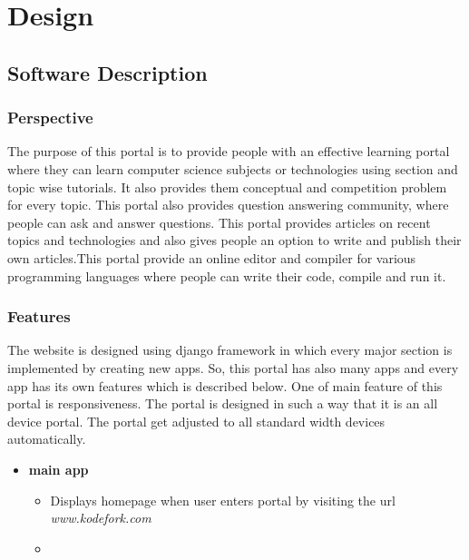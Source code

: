 \chapter{Design}
\section{Software Description}
\subsection{Perspective}
The purpose of this portal is to provide people with an effective learning portal where they can learn computer science subjects or technologies using section and topic wise tutorials. It also provides them conceptual and competition problem for every topic. This portal also provides question answering community, where people can ask and answer questions. This portal provides articles on recent topics and technologies and also gives people an option to write and publish their own articles.This portal provide an online editor and compiler for various programming languages where people can write their code, compile and run it.


\subsection{Features}
The website is designed using django framework in which every major section is implemented by creating new apps. So, this portal has also many apps and every app has its own features which is described below. One of main feature of this portal is responsiveness. The portal is designed in such a way that it is an all device portal. The portal get adjusted to all standard width devices automatically.

\begin{itemize}
    \item \textbf{main app}
    \begin{itemize}
         \item Displays homepage when user enters portal by visiting the url \emph{www.kodefork.com}
         \item 
    \end{itemize}
    
\end{itemize}


